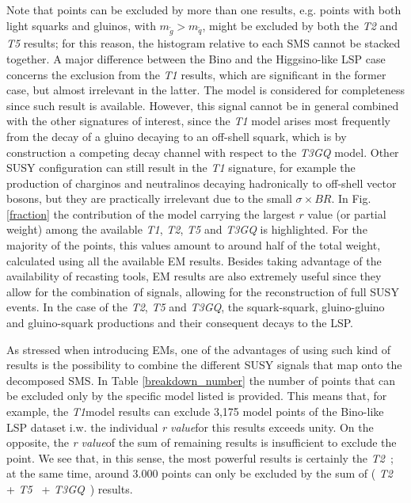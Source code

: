 \documentclass[a4paper,11pt]{article}
\newcommand{\RVALUE}{\textit{r value}}
\newcommand{\TGQ}{ \textit{T3GQ}}
\newcommand{\Tone}{ \textit{T1}}
\newcommand{\Ttwo}{ \textit{T2}}
\newcommand{\Tfive}{ \textit{T5}}
\begin{document}
%
%
%
Note that points can be excluded by more than one results, e.g. points with both light squarks and gluinos, with $m_{\tilde g} > m_{\tilde q}$, might be excluded by both the \textit{T2} and \textit{T5} results; for this reason, the histogram relative to each SMS cannot be stacked together. A major difference between the Bino and the Higgsino-like LSP case concerns the exclusion from the \textit{T1} results, which are significant in the former case, but almost irrelevant in the latter. The model is considered for completeness since such result is available. However, this signal cannot be in general combined with the other signatures of interest, since the \textit{T1} model arises most frequently from the decay of a gluino decaying to an off-shell squark, which is by construction a competing decay channel with respect to the \textit{T3GQ} model. Other SUSY configuration can still result in the \textit{T1} signature, for example the production of charginos and neutralinos decaying hadronically to off-shell vector bosons, but they are practically irrelevant due to the small $\sigma \times BR$.  
In Fig. \ref{fraction} the contribution of the model carrying the largest $r$ value (or partial weight) among the available \textit{T1}, \textit{T2}, \textit{T5} and \textit{T3GQ} is highlighted. For the majority of the points, this values amount to around half of the total weight, calculated using all the available EM results. Besides taking advantage of the availability of recasting tools, EM results are also extremely useful since they allow for the combination of signals, allowing for the reconstruction of full SUSY events. 
%
%
In the case of the \textit{T2}, \textit{T5} and \textit{T3GQ}, the squark-squark, gluino-gluino and gluino-squark productions and their consequent decays to the LSP.
%
%

As stressed when introducing EMs, one of the advantages of using such kind of results is the possibility to combine the different SUSY signals that map onto the decomposed SMS. In Table \ref{breakdown_number} the number of points that can be excluded only by the specific model listed is provided. This means that, for example, the \Tone model results can exclude 3,175 model points of the Bino-like LSP dataset i.w. the individual \RVALUE for this results exceeds unity. On the opposite, the \RVALUE of the sum of remaining results is insufficient to exclude the point. We see that, in this sense, the most powerful results is certainly the \Ttwo~; at the same time, around 3.000 points can only be excluded by the sum of (\Ttwo~ +\Tfive~ +\TGQ~) results.
\end{document}
